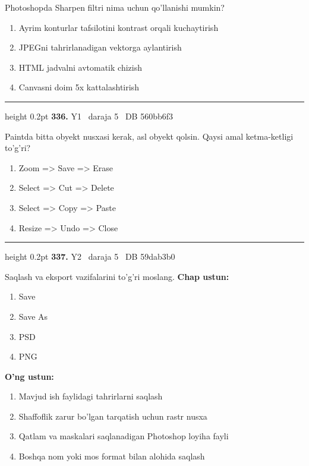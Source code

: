 \documentclass[10pt,a4paper,oneside]{article}
\begin{document}
\par
Photoshopda Sharpen filtri nima uchun qo'llanishi mumkin?
\begin{enumerate}[label=\Alph*),leftmargin=9mm]
\item Ayrim konturlar tafsilotini kontrast orqali kuchaytirish
\item JPEGni tahrirlanadigan vektorga aylantirish
\item HTML jadvalni avtomatik chizish
\item Canvasni doim 5x kattalashtirish
\end{enumerate}
\vspace{2mm}\hrule height 0.2pt \vspace{4mm}
\hypertarget{q336}{\textbf{\color{ink}336.}}  {\color{muted}\scriptsize Y1 \textbullet\ daraja 5 \textbullet\ DB 560bb6f3}
\par
Paintda bitta obyekt nusxasi kerak, asl obyekt qolsin. Qaysi amal ketma-ketligi to'g'ri?
\begin{enumerate}[label=\Alph*),leftmargin=9mm]
\item Zoom =\textgreater{} Save =\textgreater{} Erase
\item Select =\textgreater{} Cut =\textgreater{} Delete
\item Select =\textgreater{} Copy =\textgreater{} Paste
\item Resize =\textgreater{} Undo =\textgreater{} Close
\end{enumerate}
\vspace{2mm}\hrule height 0.2pt \vspace{4mm}
\hypertarget{q337}{\textbf{\color{ink}337.}}  {\color{muted}\scriptsize Y2 \textbullet\ daraja 5 \textbullet\ DB 59dab3b0}
\par
Saqlash va eksport vazifalarini to'g'ri moslang.
\textbf{\footnotesize Chap ustun:}
\begin{enumerate}[label=\arabic*),leftmargin=9mm]
\item Save
\item Save As
\item PSD
\item PNG
\end{enumerate}
\textbf{\footnotesize O'ng ustun:}
\begin{enumerate}[label=\Alph*),leftmargin=9mm]
\item Mavjud ish faylidagi tahrirlarni saqlash
\item Shaffoflik zarur bo'lgan tarqatish uchun rastr nusxa
\item Qatlam va maskalari saqlanadigan Photoshop loyiha fayli
\item Boshqa nom yoki mos format bilan alohida saqlash
\end{enumerate}
\end{document}
